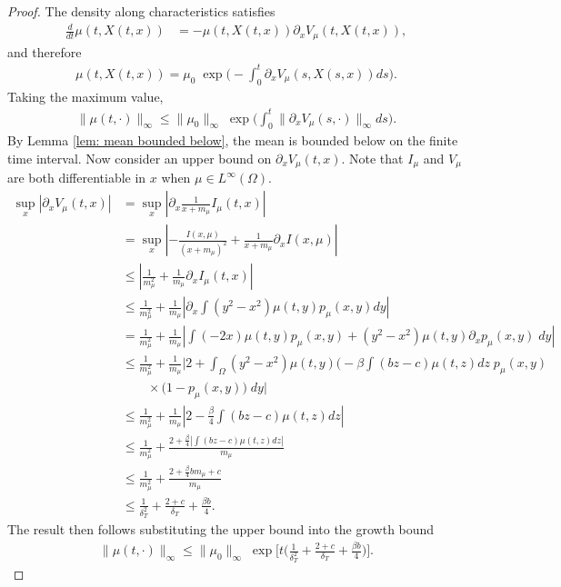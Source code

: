 \documentclass[10pt,a4paper]{amsart}
\begin{document}
\begin{proof}
    The density along characteristics satisfies
    \begin{align*}
        \frac{d}{dt}\mu(t,X(t,x)) &= - \mu(t,X(t,x)) \partial_x V_\mu(t,X(t,x)),
    \end{align*}
    and therefore
    \begin{align*}
        \mu(t,X(t,x)) = \mu_0\; \exp\Big(-\int_0^t\partial_x V_\mu(s,X(s,x))ds \bigg).
    \end{align*}
    Taking the maximum value, 
    \begin{align*}
        \|\mu(t,\cdot)\|_\infty \leq \|\mu_0\|_\infty \; \exp\Big(\int_0^t \|\partial_x V_\mu(s,\cdot)\|_\infty ds \bigg).
    \end{align*}
    By Lemma \ref{lem: mean bounded below}, the mean is bounded below on the finite time interval. Now consider an upper bound on $\partial_xV_\mu(t,x)$. Note that $I_\mu$ and $V_\mu$ are both differentiable in $x$ when $\mu \in L^\infty(\Omega)$.
    \begin{align*}
        \sup_x |\partial_x V_\mu(t,x)| &= \sup_x|\partial_x \frac{1}{x+m_\mu}I_\mu(t,x)|\\
        &= \sup_x|-\frac{I(x,\mu)}{(x+m_\mu)^2} + \frac{1}{x+m_\mu}\partial_xI(x,\mu)|\\
        &\leq |\frac{1}{m_\mu^2} + \frac{1}{m_\mu}\partial_xI_\mu(t,x)|\\
        &\leq \frac{1}{m_\mu^2} + \frac{1}{m_\mu}|\partial_x\int(y^2-x^2)\mu(t,y)p_\mu(x,y)dy|\\
        & = \frac{1}{m_\mu^2} + \frac{1}{m_\mu}|\int(-2x)\mu(t,y)p_\mu(x,y) + (y^2-x^2)\mu(t,y)\partial_xp_\mu(x,y)\; dy|\\
        &\leq \frac{1}{m_\mu^2} + \frac{1}{m_\mu}|2 + \int_\Omega (y^2-x^2)\mu(t,y)\Big(-\beta \int(bz-c)\mu(t,z) dz\; p_\mu(x,y)\\&\qquad \times (1-p_\mu(x,y)\Big)\; dy|\\
        &\leq \frac{1}{m_\mu^2} + \frac{1}{m_\mu}|2 -\frac{\beta}{4} \int(bz-c)\mu(t,z)dz|\\
        &\leq \frac{1}{m_\mu^2} + \frac{2 + \frac{\beta}{4} |\int(bz-c)\mu(t,z)dz|}{m_\mu}\\
        &\leq \frac{1}{m_\mu^2} + \frac{2 + \frac{\beta}{4} b m_\mu + c}{m_\mu}\\
        &\leq \frac{1}{\delta_T^2} + \frac{2+c}{\delta_T} + \frac{\beta b}{4}.
    \end{align*}
    The result then follows substituting the upper bound into the growth bound
    \begin{align*}
        \|\mu(t,\cdot)\|_\infty \leq \|\mu_0\|_\infty \; \exp\bigg[t\big(\frac{1}{\delta_T^2} + \frac{2+c}{\delta_T} + \frac{\beta b}{4}\big)\bigg].
    \end{align*}
\end{proof}
\end{document}
